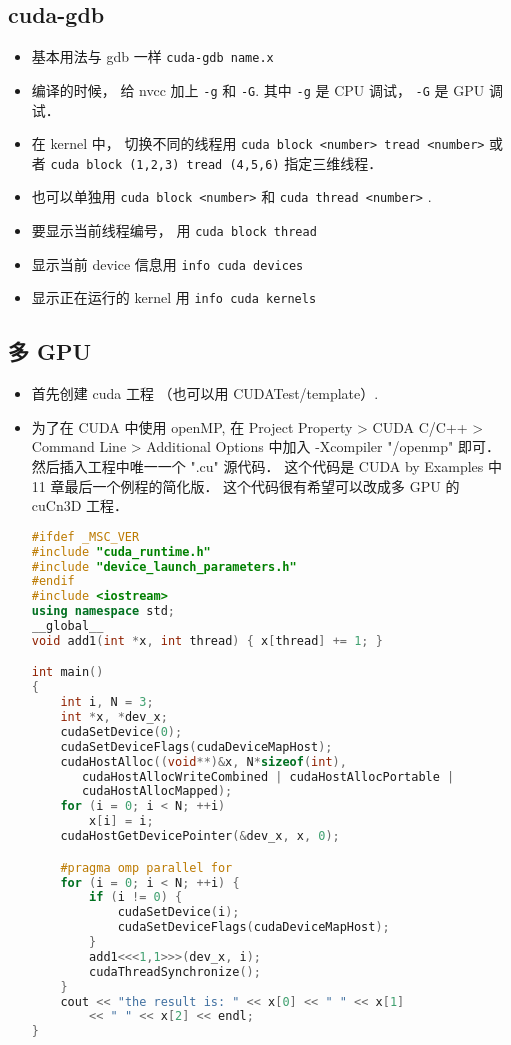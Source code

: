 \subsection{cuda-gdb}
\begin{itemize}
\item 基本用法与 gdb 一样 \verb|cuda-gdb name.x|
\item 编译的时候， 给 nvcc 加上 \verb`-g` 和 \verb`-G`. 其中 \verb`-g` 是 CPU 调试， \verb`-G` 是 GPU 调试．
\item 在 kernel 中， 切换不同的线程用
\verb`cuda block <number> tread <number>` 或者 \verb`cuda block (1,2,3) tread (4,5,6)` 指定三维线程．
\item 也可以单独用 \verb`cuda block <number>` 和 \verb`cuda thread <number>` .
\item 要显示当前线程编号， 用 \verb`cuda block thread`
\item 显示当前 device 信息用 \verb`info cuda devices`
\item 显示正在运行的 kernel 用 \verb`info cuda kernels`
\end{itemize}

\subsection{多 GPU}
\begin{itemize}
\item 首先创建 cuda 工程 （也可以用 CUDATest/template）.
\item 为了在 CUDA 中使用 openMP, 在 Project Property > CUDA C/C++ > Command Line > Additional Options 中加入 -Xcompiler "/openmp" 即可． 然后插入工程中唯一一个 ".cu" 源代码． 这个代码是 CUDA by Examples 中 11 章最后一个例程的简化版． 这个代码很有希望可以改成多 GPU 的 cuCn3D 工程．
\begin{lstlisting}[language=cpp]
#ifdef _MSC_VER
#include "cuda_runtime.h"
#include "device_launch_parameters.h"
#endif
#include <iostream>
using namespace std;
__global__
void add1(int *x, int thread) { x[thread] += 1; }

int main()
{
	int i, N = 3;
	int *x, *dev_x;
	cudaSetDevice(0);
	cudaSetDeviceFlags(cudaDeviceMapHost);
	cudaHostAlloc((void**)&x, N*sizeof(int),
       cudaHostAllocWriteCombined | cudaHostAllocPortable | 
       cudaHostAllocMapped);
	for (i = 0; i < N; ++i)
		x[i] = i;
	cudaHostGetDevicePointer(&dev_x, x, 0);

	#pragma omp parallel for
	for (i = 0; i < N; ++i) {
		if (i != 0) {
			cudaSetDevice(i);
			cudaSetDeviceFlags(cudaDeviceMapHost);
		}
		add1<<<1,1>>>(dev_x, i);
		cudaThreadSynchronize();
	}
	cout << "the result is: " << x[0] << " " << x[1]
        << " " << x[2] << endl;
}
\end{lstlisting}
\end{itemize}
